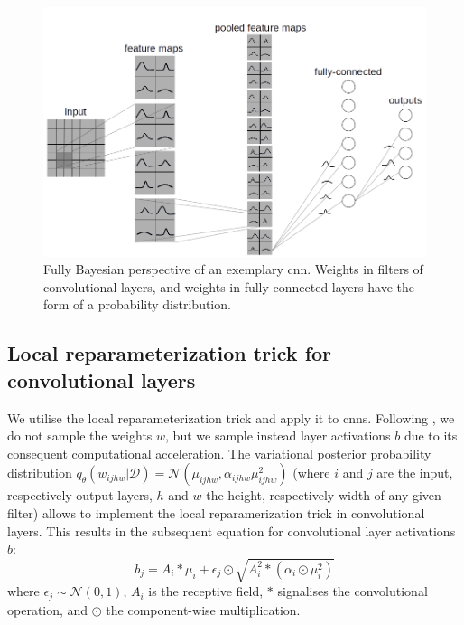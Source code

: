 %
\begin{figure}[b!] 
\begin{center}
\includegraphics[width=\linewidth]{Chapter4/Figs/CNNwithdist_grey.png}
\caption{Fully Bayesian perspective of an exemplary \ac{cnn}. Weights in filters of convolutional layers, and weights in fully-connected layers have the form of a probability distribution.}
\label{fig:CNNwithdist_grey}
\end{center}
\end{figure} 
%
\subsection{Local reparameterization trick for convolutional layers}
We utilise the local reparameterization trick \cite{kingma2015variational} and apply it to \acp{cnn}. Following \cite{kingma2015variational,neklyudov2018variance}, we do not sample the weights $w$, but we sample instead layer activations $b$ due to its consequent computational acceleration. The variational posterior probability distribution $q_{\theta}(w_{ijhw}|\mathcal{D})=\mathcal{N}(\mu_{ijhw},\alpha_{ijhw}\mu^2_{ijhw})$ (where $i$ and $j$ are the input, respectively output layers, $h$ and $w$ the height, respectively width of any given filter) allows to implement the local reparamerization trick in convolutional layers. This results in the subsequent equation for convolutional layer activations $b$:
\begin{equation}
    b_j=A_i\ast \mu_i+\epsilon_j\odot \sqrt{A^2_i\ast (\alpha_i\odot \mu^2_i)}
\end{equation}
where $\epsilon_j \sim \mathcal{N}(0,1)$, $A_i$ is the receptive field, $\ast$ signalises the convolutional operation, and $\odot$ the component-wise multiplication.

